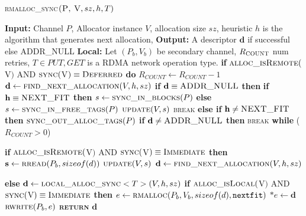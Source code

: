 \documentclass[10pt]{article}
\begin{document}
\begin{algorithm}{}
\footnotesize
\caption{\textsc{rmalloc\_sync}{$\textsc{(P, V}, sz, h, T)$}}
\label{alg:rmalloc_sync} 
\begin{algorithmic}[1]


\STATE \textbf{Input:} Channel $P$, Allocator instance $V$, allocation size $sz$, heuristic $h$
is the algorithm that generates next allocation, 
\STATE \textbf{Output:} A descriptor {$\textbf{d}$} if successful else \textsc{ADDR\_NULL}
\STATE \textbf{Local:} Let $(P_{b}, V_{b})$ be secondary channel, $R_{\textsc{COUNT}}$ num retries, $T\in {PUT, GET}$ is a RDMA network operation type.
\STATE \textbf{if} $\textsc{alloc\_isRemote}($V$)$ AND $\textsc{sync}($V$) \equiv \textsc{Deferred}$ 
\STATE \quad \textbf{do}
\STATE \qquad $R_{COUNT} \gets R_{COUNT}-1$
\STATE \qquad $\textbf{d} \leftarrow  \textsc{find\_next\_allocation}(V, h, sz)$ 
\STATE \qquad \textbf{if} $\textbf{d} \equiv \textsc{ADDR\_NULL}$ \textbf{then}
\STATE \qquad \quad \textbf{if} $\textbf{h} \equiv \textsc{NEXT\_FIT}$ \textbf{then}
\STATE \qquad \qquad $s \gets \textsc{sync\_in\_blocks}(P)$
\STATE \qquad \quad\textbf{else} 
\STATE \qquad \qquad $s \gets \textsc{sync\_in\_free\_tags}(P)$
\STATE \qquad \quad $\textsc{update}(V, s)$
\STATE \qquad \quad \textsc{break}
\STATE \qquad \textbf{else if}  $\textbf{h} \neq \textsc{NEXT\_FIT}$ \textbf{then}
\STATE \qquad \quad $\textsc{sync\_out\_alloc\_tags}(P)$
\STATE \qquad \textbf{if}  $\textbf{d} \neq \textsc{ADDR\_NULL}$ \textbf{then}
\STATE \qquad \quad \textsc{break}
\STATE \quad \textbf{while} ($R_{COUNT} > 0$)

\STATE \textbf{if} $\textsc{alloc\_isRemote}($V$)$ AND $\textsc{sync}($V$) \equiv \textsc{Immediate}$ \textbf{then}
\STATE \quad $\textbf{s} \gets \textsc{rread}(P_{b}, sizeof(d))$ 
\STATE \quad $\textsc{update}(V, s)$
\STATE \quad $\textbf{d} \gets \textsc{find\_next\_allocation}(V, h, sz)$ 

\STATE \textbf{else}
\STATE \quad $\textbf{d} \gets \textsc{local\_alloc\_sync}<T>(V, h, sz)$ 
\STATE \quad \textbf{if} $\textsc{alloc\_isLocal}($V$)$ AND $\textsc{sync}($V$) \equiv \textsc{Immediate}$ \textbf{then}
\STATE \qquad $e \gets \textsc{rmalloc}(P_{b}, V_{b}, sizeof(d), \texttt{nextfit})$
\STATE \qquad $*e \gets \textbf{d}$
\STATE \qquad $\textsc{rwrite}(P_{b}, e)$ 
\STATE \textsc{\textbf{return}} {$\textbf{d}$}

\end{algorithmic}
\end{algorithm}
\end{document}
